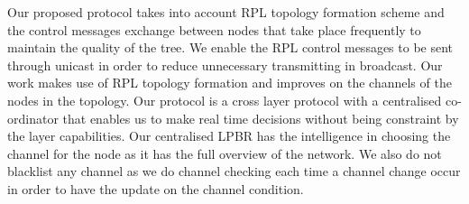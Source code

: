 Our proposed protocol takes into account RPL topology formation scheme and the control messages exchange between nodes that take place frequently to maintain the quality of the tree. We enable the RPL control messages to be sent through unicast in order to reduce unnecessary transmitting in broadcast. Our work makes use of RPL topology formation and improves on the channels of the nodes in the topology. Our protocol is a cross layer protocol with a centralised co-ordinator that enables us to make real time decisions without being constraint by the layer capabilities. Our centralised LPBR has the intelligence in choosing the channel for the node as it has the full overview of the network. We also do not blacklist any channel as we do channel checking each time a channel change occur in order to have the update on the channel condition.


